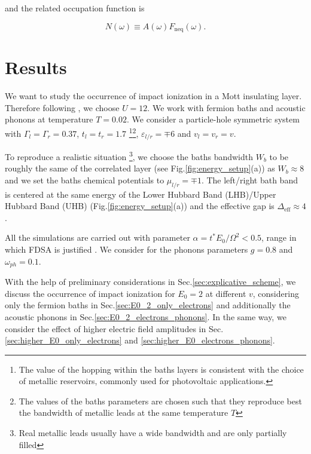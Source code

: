 \documentclass[aps,prb,groupedaddress,showpacs,twocolumn,superscriptaddress,10pt]{revtex4-2}
\begin{document}
and the related occupation function is

\begin{equation}
\label{eq:Filling_func}
N(\omega) \equiv A(\omega)F_{\text{neq}}(\omega).
\end{equation}
    
\section{Results}
\label{sec:results}       
 
We want to study the occurrence of impact ionization in a Mott insulating layer. Therefore following \cite{so.do.18}, we choose $U=12$. We work with fermion baths and acoustic phonons at temperature $T=0.02$. We consider a particle-hole symmetric system with $\Gamma_l=\Gamma_r=0.37$, $t_l=t_r=1.7$ \footnote{The value of the hopping within the baths layers is consistent with the choice of metallic reservoirs, commonly used for photovoltaic applications.}\footnote{The values of the baths parameters are chosen such that they reproduce best the bandwidth of metallic leads at the same temperature $T$}, $\varepsilon_{l/r}=\mp 6$ and $v_l=v_r=v$. 

To reproduce a realistic situation \footnote{ Real metallic leads usually have a wide bandwidth and are only partially filled}, we choose the baths bandwidth $W_b$ to be roughly the same of the correlated layer (see Fig.\ref{fig:energy_setup}(a)) as $W_b\approx8$ and we set the baths chemical potentials to $\mu_{l/r} =\mp 1$. The left/right bath band is centered at the same energy of the Lower Hubbard Band (LHB)/Upper Hubbard Band (UHB) (Fig.\ref{fig:energy_setup}(a)) and the effective gap is $\Delta_{\textrm{eff}} \approx 4$.
  
All the simulations are carried out with parameter $\alpha=t^{*}E_0/\Omega^{2}<0.5$, range in which FDSA is justified \cite{so.do.18}. We consider for the phonons parameters $g=0.8$ and $\omega_{ph}=0.1$.  

With the help of preliminary considerations in Sec.\ref{sec:explicative_scheme}, we discuss the occurrence of impact ionization for $E_0=2$ at different $v$, considering only the fermion baths in Sec.\ref{sec:E0_2_only_electrons} and additionally the acoustic phonons in Sec.\ref{sec:E0_2_electrons_phonons}. In the same way, we consider the effect of higher electric field amplitudes in Sec.\ref{sec:higher_E0_only_electrons} and \ref{sec:higher_E0_electrons_phonons}. 
\end{document}
